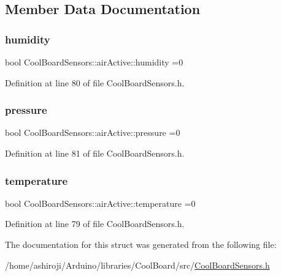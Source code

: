 \subsection{Member Data Documentation}
\mbox{\label{struct_cool_board_sensors_1_1air_active_ab69738e9fd1c2ba80dc666bcd1e116f7}} 
\subsubsection{\texorpdfstring{humidity}{humidity}}
{\footnotesize\ttfamily bool Cool\+Board\+Sensors\+::air\+Active\+::humidity =0}



Definition at line 80 of file Cool\+Board\+Sensors.\+h.

\mbox{\label{struct_cool_board_sensors_1_1air_active_a15932ccfb6ee6603713d937ec9b76b72}} 
\subsubsection{\texorpdfstring{pressure}{pressure}}
{\footnotesize\ttfamily bool Cool\+Board\+Sensors\+::air\+Active\+::pressure =0}



Definition at line 81 of file Cool\+Board\+Sensors.\+h.

\mbox{\label{struct_cool_board_sensors_1_1air_active_ac08576736c7ac3bfbfec32e5ee17c686}} 
\subsubsection{\texorpdfstring{temperature}{temperature}}
{\footnotesize\ttfamily bool Cool\+Board\+Sensors\+::air\+Active\+::temperature =0}



Definition at line 79 of file Cool\+Board\+Sensors.\+h.



The documentation for this struct was generated from the following file\+:\begin{DoxyCompactItemize}
\item 
/home/ashiroji/\+Arduino/libraries/\+Cool\+Board/src/\hyperlink{_cool_board_sensors_8h}{Cool\+Board\+Sensors.\+h}\end{DoxyCompactItemize}
